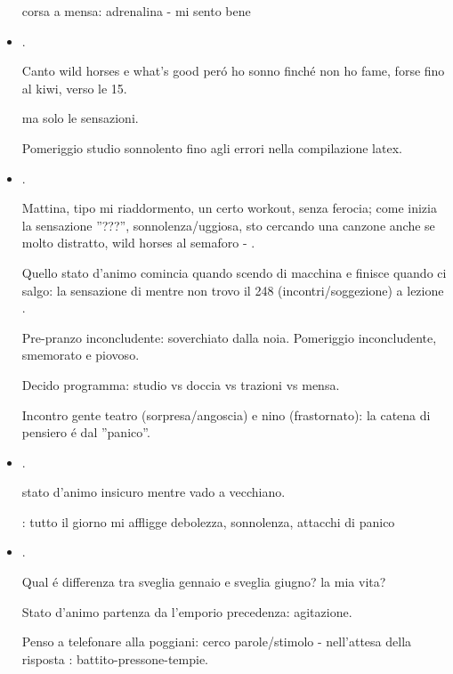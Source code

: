 \begin{itemize}
corsa a mensa: adrenalina - mi sento bene

\item {}.

Canto wild horses e what's good per\'o ho sonno finch\'e non ho fame, forse fino al kiwi, verso le 15.

 ma solo le sensazioni.

Pomeriggio studio sonnolento fino agli errori nella compilazione latex.

\item {}.

Mattina, tipo mi riaddormento, un certo workout, senza ferocia; come inizia la sensazione ''???'', sonnolenza/uggiosa, sto cercando una canzone anche se molto distratto, wild horses al semaforo - .

Quello stato d'animo comincia quando scendo di macchina e finisce quando ci salgo: la sensazione di  mentre non trovo il 248 (incontri/soggezione) a lezione .

Pre-pranzo inconcludente: soverchiato dalla noia. Pomeriggio inconcludente, smemorato e piovoso.

Decido programma: studio vs doccia vs trazioni vs mensa.

Incontro gente teatro (sorpresa/angoscia) e nino (frastornato):
la catena di pensiero \'e  dal ''panico''.

\item {}.

stato d'animo insicuro mentre vado a vecchiano.

: tutto il giorno mi affligge debolezza, sonnolenza, attacchi di panico

\item {}.

Qual \'e differenza tra sveglia gennaio e sveglia giugno? la mia vita?

Stato d'animo partenza da l'emporio precedenza: agitazione.

Penso a telefonare alla poggiani: cerco parole/stimolo - nell'attesa della risposta : battito-pressone-tempie.


\end{itemize}

